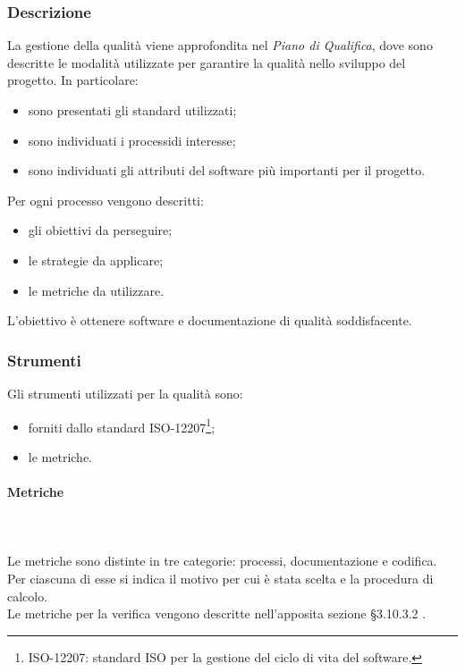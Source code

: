 \subsubsection{Descrizione}
La gestione della qualità viene approfondita nel \textit{Piano di Qualifica}, dove sono descritte le modalità utilizzate per garantire la qualità nello sviluppo del progetto. In particolare: \begin{itemize}
\item sono presentati gli standard utilizzati;
\item sono individuati i processi\glo di interesse;
\item sono individuati gli attributi del software più importanti per il progetto.
\end{itemize}
Per ogni processo vengono descritti: \begin{itemize}
\item gli obiettivi da perseguire;
\item le strategie da applicare;
\item le metriche da utilizzare.
\end{itemize}
L'obiettivo è ottenere software e documentazione di qualità soddisfacente.

\subsubsection{Strumenti}
Gli strumenti utilizzati per la qualità sono:
\begin{itemize}
\item forniti dallo standard ISO-12207\footnote{ISO-12207: standard ISO per la gestione del ciclo di vita del software.};
\item le metriche.
\end{itemize}
\paragraph{Metriche} \mbox{} \\ \mbox{} \\
Le metriche sono distinte in tre categorie: processi, documentazione e codifica. Per ciascuna di esse si indica il motivo per cui è stata scelta e la procedura di calcolo. \\
Le metriche per la verifica vengono descritte nell'apposita sezione \S 3.10.3.2 .

